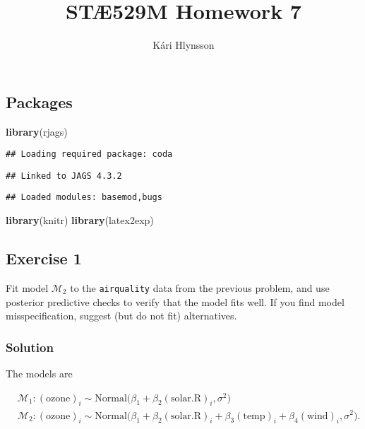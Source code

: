 \documentclass[
]{article}
\title{STÆ529M Homework 7}
\author{Kári Hlynsson}
\date{}
\newenvironment{Shaded}{\begin{snugshade}}{\end{snugshade}}
\newcommand{\FunctionTok}[1]{\textcolor[rgb]{0.13,0.29,0.53}{\textbf{#1}}}
\newcommand{\NormalTok}[1]{#1}
\begin{document}
\maketitle

\subsection{Packages}\label{packages}

\begin{Shaded}
\begin{Highlighting}[]
\FunctionTok{library}\NormalTok{(rjags)}
\end{Highlighting}
\end{Shaded}

\begin{verbatim}
## Loading required package: coda
\end{verbatim}

\begin{verbatim}
## Linked to JAGS 4.3.2
\end{verbatim}

\begin{verbatim}
## Loaded modules: basemod,bugs
\end{verbatim}

\begin{Shaded}
\begin{Highlighting}[]
\FunctionTok{library}\NormalTok{(knitr)}
\FunctionTok{library}\NormalTok{(latex2exp)}
\end{Highlighting}
\end{Shaded}

\subsection{Exercise 1}\label{exercise-1}

Fit model \(\mathcal M_2\) to the \texttt{airquality} data from the
previous problem, and use posterior predictive checks to verify that the
model fits well. If you find model misspecification, suggest (but do not
fit) alternatives.

\subsubsection{Solution}\label{solution}

The models are

\[
\begin{align*}
    &\mathcal M_1 : \mathrm{(ozone)}_i \sim \mathrm{Normal}\big(\beta_1 + \beta_2 (\mathrm{solar.R})_i, \sigma^2\big) \\
    &\mathcal M_2: \mathrm{(ozone)}_i \sim \mathrm{Normal}\big(\beta_1 + \beta_2 \mathrm{(solar.R)}_i + \beta_3 \mathrm{(temp)}_i + \beta_4 \mathrm{(wind)}_i, \sigma^2\big).
\end{align*}
\]
\end{document}
